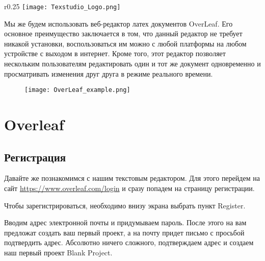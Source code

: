     \begin{wrapfigure}{r}{0.25\textwidth}
        \centering
        \texttt{[image: Texstudio\_Logo.png]}
        \caption{}
    \end{wrapfigure}



    Мы же будем использовать веб-редактор латех документов OverLeaf. Его основное преимущество заключается в том, что данный редактор не требует никакой установки, воспользоваться им можно с любой платформы на любом устройстве с выходом в интернет.
    Кроме того, этот редактор позволяет нескольким пользователям редактировать один и тот же документ одновременно и просматривать изменения друг друга в режиме реального времени.

    \begin{figure}[h!]
        \centering
        \texttt{[image: OverLeaf\_example.png]}
        \caption{}
        \label{OverLeaf_example}
    \end{figure}

    \section{Overleaf}

    \subsection{Регистрация}

    Давайте же познакомимся с нашим текстовым редактором. Для этого перейдем на сайт 
    \href{https://www.overleaf.com/login}{https://www.overleaf.com/login} 
    и сразу попадем на страницу регистрации. 

    
    Чтобы зарегистрироваться, необходимо внизу экрана выбрать пункт Register.


    Вводим адрес электронной почты и придумываем пароль. После этого на вам предложат создать ваш первый проект, а на почту придет письмо с просьбой подтвердить адрес. Абсолютно ничего сложного,
    подтверждаем адрес и создаем наш первый проект Blank Project.


